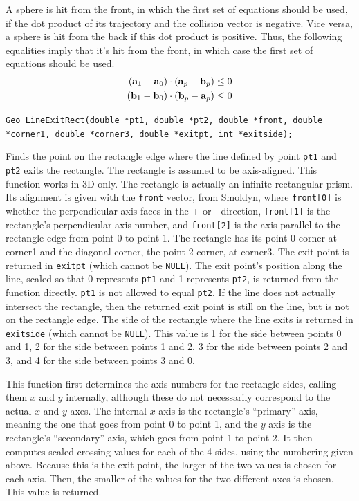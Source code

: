 \documentclass[11pt]{article}
\newcommand {\ttt} {\texttt}
\begin{document}
\begin{description}
A sphere is hit from the front, in which the first set of equations should be used, if the dot product of its trajectory and the collision vector is negative. Vice versa, a sphere is hit from the back if this dot product is positive. Thus, the following equalities imply that it's hit from the front, in which case the first set of equations should be used.
\begin{align*}
(\vb{a}_1-\vb{a}_0) \cdot (\vb{a}_p-\vb{b}_p) &\le 0 \\
(\vb{b}_1-\vb{b}_0) \cdot (\vb{b}_p-\vb{a}_p) &\le 0
\end{align*}

\item[\underline{Exit functions}]

\item[\ttt{double}]
\ttt{Geo\_LineExitRect(double *pt1, double *pt2, double *front, double *corner1, double *corner3, double *exitpt, int *exitside);}

Finds the point on the rectangle edge where the line defined by point \ttt{pt1} and \ttt{pt2} exits the rectangle. The rectangle is assumed to be axis-aligned. This function works in 3D only. The rectangle is actually an infinite rectangular prism. Its alignment is given with the \ttt{front} vector, from Smoldyn, where \ttt{front[0]} is whether the perpendicular axis faces in the + or - direction, \ttt{front[1]} is the rectangle's perpendicular axis number, and \ttt{front[2]} is the axis parallel to the rectangle edge from point 0 to point 1. The rectangle has its point 0 corner at corner1 and the diagonal corner, the point 2 corner, at corner3. The exit point is returned in \ttt{exitpt} (which cannot be \ttt{NULL}). The exit point's position along the line, scaled so that 0 represents \ttt{pt1} and 1 represents \ttt{pt2}, is returned from the function directly. \ttt{pt1} is not allowed to equal \ttt{pt2}. If the line does not actually intersect the rectangle, then the returned exit point is still on the line, but is not on the rectangle edge. The side of the rectangle where the line exits is returned in \ttt{exitside} (which cannot be \ttt{NULL}). This value is 1 for the side between points 0 and 1, 2 for the side between points 1 and 2, 3 for the side between points 2 and 3, and 4 for the side between points 3 and 0.

This function first determines the axis numbers for the rectangle sides, calling them $x$ and $y$ internally, although these do not necessarily correspond to the actual $x$ and $y$ axes. The internal $x$ axis is the rectangle's ``primary'' axis, meaning the one that goes from point 0 to point 1, and the $y$ axis is the rectangle's ``secondary'' axis, which goes from point 1 to point 2. It then computes scaled crossing values for each of the 4 sides, using the numbering given above. Because this is the exit point, the larger of the two values is chosen for each axis. Then, the smaller of the values for the two different axes is chosen. This value is returned.


\end{description}
\end{document}
